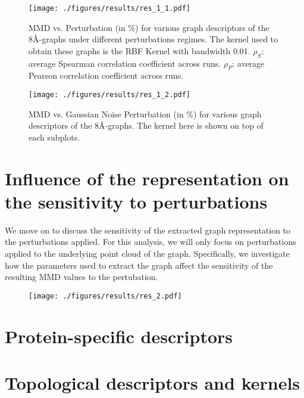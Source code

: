 \begin{figure}
  \centering
  \texttt{[image: ./figures/results/res\_1\_1.pdf]}
  \caption{MMD vs. Perturbation (in \%) for various graph descriptors of the 8\si{\angstrom}-graphs under different perturbations regimes. The kernel
    used to obtain these graphs is the RBF Kernel with bandwidth 0.01.
    $\rho_{S}$: average Spearman correlation coefficient across runs.
    $\rho_{P}$: average Pearson correlation coefficient across runs.}
  \label{fig:mmd_consistent_eps}
\end{figure}


\begin{figure}
  \centering
  \texttt{[image: ./figures/results/res\_1\_2.pdf]}
  \caption{MMD vs. Gaussian Noise Perturbation (in \%) for various graph descriptors of the
    8\si{\angstrom}-graphs. The kernel here is shown on top of each subplots.}
  \label{fig:mmd_effect_kernel}
\end{figure}



\section{Influence of the representation on the sensitivity to perturbations}

We move on to discuss the sensitivity of the extracted graph representation to
the perturbations applied. For this analysis, we will only focus on
perturbations applied to the underlying point cloud of the graph. Specifically,
we investigate how the parameters used to extract the graph affect the
sensitivity of the resulting MMD values to the pertubation.

\begin{figure}
  \texttt{[image: ./figures/results/res\_2.pdf]}
\end{figure}

\section{Protein-specific descriptors}


\section{Topological descriptors and kernels}

